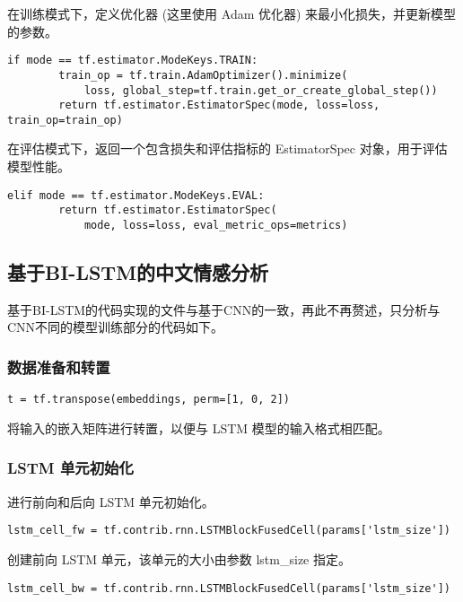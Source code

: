 在训练模式下，定义优化器 (这里使用 Adam 优化器) 来最小化损失，并更新模型的参数。

\begin{lstlisting}
if mode == tf.estimator.ModeKeys.TRAIN:
        train_op = tf.train.AdamOptimizer().minimize(
            loss, global_step=tf.train.get_or_create_global_step())
        return tf.estimator.EstimatorSpec(mode, loss=loss, train_op=train_op)
\end{lstlisting}

在评估模式下，返回一个包含损失和评估指标的 EstimatorSpec 对象，用于评估模型性能。

\begin{lstlisting}
elif mode == tf.estimator.ModeKeys.EVAL:
        return tf.estimator.EstimatorSpec(
            mode, loss=loss, eval_metric_ops=metrics)
\end{lstlisting}

\subsection{基于BI-LSTM的中文情感分析}

基于BI-LSTM的代码实现的文件与基于CNN的一致，再此不再赘述，只分析与CNN不同的模型训练部分的代码如下。

\subsubsection{数据准备和转置}

\begin{lstlisting}
t = tf.transpose(embeddings, perm=[1, 0, 2])\end{lstlisting}

将输入的嵌入矩阵进行转置，以便与 LSTM 模型的输入格式相匹配。

\subsubsection{LSTM 单元初始化}

进行前向和后向 LSTM 单元初始化。

\begin{lstlisting}
lstm_cell_fw = tf.contrib.rnn.LSTMBlockFusedCell(params['lstm_size'])\end{lstlisting}

创建前向 LSTM 单元，该单元的大小由参数 lstm\_size 指定。

\begin{lstlisting}
lstm_cell_bw = tf.contrib.rnn.LSTMBlockFusedCell(params['lstm_size'])\end{lstlisting}

